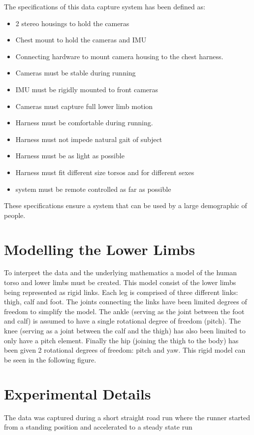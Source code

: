The specifications of this data capture system has been defined as:
\begin{itemize}
\item 2 stereo housings to hold the cameras
\item Chest mount to hold the cameras and IMU
\item Connecting hardware to mount camera housing to the chest harness.
\item Cameras must be stable during running
\item IMU must be rigidly mounted to front cameras
\item Cameras must capture full lower limb motion
\item Harness must be comfortable during running.
\item Harness must not impede natural gait of subject
\item Harness must be as light as possible
\item Harness must fit different size torsos and for different sexes
\item system must be remote controlled as far as possible 
\end{itemize}

These specifications ensure a system that can be used by a large demographic of people.

\section{Modelling the Lower Limbs}
To interpret the data and the underlying mathematics a model of the human torso and lower limbs must be created. This model consist of the lower limbs being represented as rigid links. Each leg is comprised of three different links: thigh, calf and foot. The joints connecting the links have been limited degrees of freedom to simplify the model. The ankle (serving as the joint between the foot and calf) is assumed to have a single rotational degree of freedom (pitch). The knee (serving as a joint between the calf and the thigh) has also been limited to only have a pitch element. Finally the hip (joining the thigh to the body) has been given 2 rotational degrees of freedom: pitch and yaw. This rigid model can be seen in the following figure.

\section{Experimental Details}
The data was captured during a short straight road run where the runner started from a standing position and accelerated to a steady state run

